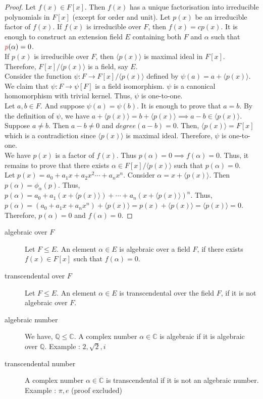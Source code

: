 \begin{proof}
	Let $f(x) \in F[x]$.
	Then $f(x)$ has a unique factorisation into irreducible polynomials in $F[x]$ (except for order and unit).
	Let $p(x)$ be an irreducible factor of $f(x)$.
	If $f(x)$ is irreducible over $F$, then $f(x) = cp(x)$.
	It is enough to construct an extension field $E$ containing both $F$ and $\alpha$ such that ${\color{red}p}(\alpha) = 0$.\\


	If $p(x)$ is irreducible over $F$, then $\langle p(x) \rangle$ is maximal ideal in $F[x]$.
	Therefore, $F[x]/\langle p(x) \rangle$ is a field, say $E$.\\


	Consider the function $\psi : F \to F[x]/\langle p(x) \rangle$ defined by $\psi(a) = a+\langle p(x) \rangle$.
	We claim that $\psi : F \to \psi[F]$ is a field isomorphism.
	$\psi$ is a canonical homomorphism with trivial kernel. Thus, $\psi$ is one-to-one.\\


	Let $a,b \in F$.
	And suppose $\psi(a) = \psi(b)$.
	It is enough to prove that $a = b$.
	By the definition of $\psi$, we have $a+\langle p(x) \rangle = b + \langle p(x) \rangle \implies a-b \in \langle p(x) \rangle$.
	Suppose $a \ne b$.
	Then $a-b \ne 0$ and $degree(a-b) = 0$.
	Then, $\langle p(x) \rangle = F[x]$ which is a contradiction since $\langle p(x) \rangle$ is maximal ideal.
	Therefore, $\psi$ is one-to-one.\\

	
	We have $p(x)$ is a factor of $f(x)$.
	Thus $p(\alpha) = 0 \implies f(\alpha) = 0$.
	Thus, it remains to prove that there exists $\alpha \in F[x]/\langle p(x) \rangle$ such that $p(\alpha) = 0$.\\

	Let $p(x) = a_0 + a_1x + a_2 x^2\cdots + a_n x^n$.
	Consider $\alpha = x + \langle p(x) \rangle$.
	Then $p(\alpha) = \phi_\alpha(p)$.
	Thus, $p(\alpha) = a_0 + a_1(x+\langle p(x) \rangle) + \cdots + a_n(x + \langle p(x) \rangle)^n$.
	Thus, $p(\alpha) = (a_0+a_1x + a_n x^n) + \langle p(x) \rangle = p(x) + \langle p(x) \rangle = \langle p(x) \rangle = 0$.
	Therefore, $p(\alpha) = 0$ and $f(\alpha) = 0$.
\end{proof}

\begin{description}
	\item[algebraic over $F$] Let $F \le E$.
		An element $\alpha \in E$ is algebraic over a field $F$, if there exists $f(x) \in F[x]$ such that $f(\alpha) = 0$.
	\item[transcendental over $F$] Let $F \le E$.
		An element $\alpha \in E$ is transcendental over the field $F$, if it is not algebraic over $F$.
	\item[algebraic number] We have, $\mathbb{Q} \le \mathbb{C}$. A complex number $\alpha \in \mathbb{C}$ is algebraic if  it is algebraic over $\mathbb{Q}$.
		Example : $2,\sqrt{2},i$
	\item[transcendental number] A complex number $\alpha \in \mathbb{C}$ is transcendental if it is not an algebraic number.
		Example : $\pi,e$ (proof excluded)
\end{description}

